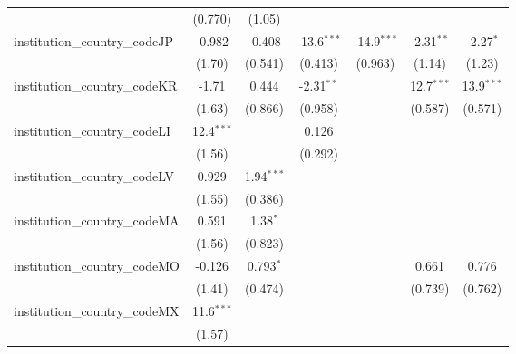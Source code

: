 \begin{tabular}{lcccccc}
                                         & (0.770)       & (1.05)        &               &               &               &   \\   
   institution\_country\_codeJP          & -0.982        & -0.408        & -13.6$^{***}$ & -14.9$^{***}$ & -2.31$^{**}$  & -2.27$^{*}$\\   
                                         & (1.70)        & (0.541)       & (0.413)       & (0.963)       & (1.14)        & (1.23)\\   
   institution\_country\_codeKR          & -1.71         & 0.444         & -2.31$^{**}$  &               & 12.7$^{***}$  & 13.9$^{***}$\\   
                                         & (1.63)        & (0.866)       & (0.958)       &               & (0.587)       & (0.571)\\   
   institution\_country\_codeLI          & 12.4$^{***}$  &               & 0.126         &               &               &   \\   
                                         & (1.56)        &               & (0.292)       &               &               &   \\   
   institution\_country\_codeLV          & 0.929         & 1.94$^{***}$  &               &               &               &   \\   
                                         & (1.55)        & (0.386)       &               &               &               &   \\   
   institution\_country\_codeMA          & 0.591         & 1.38$^{*}$    &               &               &               &   \\   
                                         & (1.56)        & (0.823)       &               &               &               &   \\   
   institution\_country\_codeMO          & -0.126        & 0.793$^{*}$   &               &               & 0.661         & 0.776\\   
                                         & (1.41)        & (0.474)       &               &               & (0.739)       & (0.762)\\   
   institution\_country\_codeMX          & 11.6$^{***}$  &               &               &               &               &   \\   
                                         & (1.57)        &               &               &               &               &   \\   

\end{tabular}
